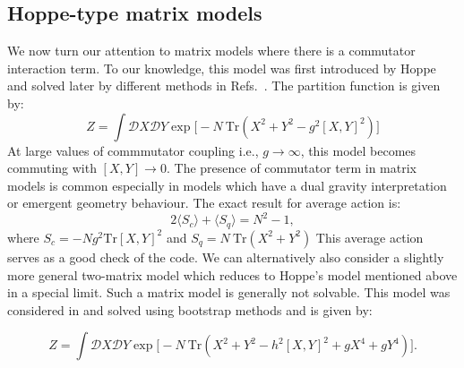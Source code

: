 \documentclass[11pt]{article}
\begin{document}
\subsection{\label{subsec:Hoppe}Hoppe-type matrix models}

We now turn our attention to matrix models where there is a commutator interaction term. To our knowledge, this model 
was first introduced by Hoppe \cite{Hoppe:1982en} and solved later by different methods in Refs.~\cite{Kazakov:1998ji,Berenstein:2008eg}.
The partition function is given by:
\begin{equation}
Z = \int \mathcal{D}X \mathcal{D}Y \exp \Big[-N ~ \mbox{Tr} (X^2 + Y^2 - g^2 [X,Y]^2) \Big] 
\end{equation}
At large values of commmutator coupling i.e., $ g \to \infty$, this model becomes commuting with 
$ [X,Y] \to 0$. The presence of commutator term in matrix models is common especially in 
models which have a dual gravity interpretation or emergent geometry behaviour.  The exact result for average action is:
\begin{equation}
	2 \langle S_{c} \rangle + \langle S_{q}  \rangle = N^2 - 1, 
\end{equation}
where $ S_{c} = -Ng^2 \mbox{Tr}[X,Y]^2$  and 
$ S_{q} = N~\mbox{Tr} (X^2 + Y^2) $
This average action serves as a good check of the code. We can alternatively also consider a slightly more 
general two-matrix model which reduces to Hoppe's model mentioned above in a special limit. 
Such a matrix model is generally not solvable. This model was considered in \cite{Kazakov:2021lel} and 
solved using bootstrap methods and is given by:

\begin{equation}
\label{eq:GHM1} 
Z = \int \mathcal{D}X \mathcal{D}Y \exp \Big[-N ~ \mbox{Tr} (X^2 + Y^2 - h^2 [X,Y]^2 + gX^4 + gY^4) \Big].	
\end{equation}
\end{document}
